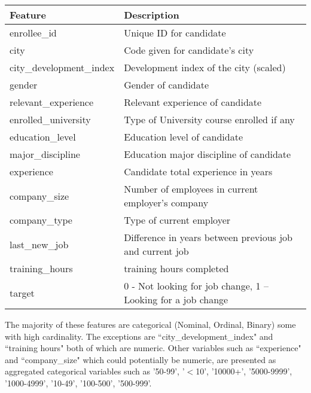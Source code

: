 \documentclass[11pt]{article}
\begin{document}
\begin{table}[h]
\centering
\begin{tabular}{ |p{4cm}||p{10cm}|  }
 
 \hline
 Feature 		& Description		\\
 \hline
enrollee\_id 	& Unique ID for candidate\\
city			& Code given for candidate's city \\
city\_development\_index & Development index of the city (scaled)\\
gender		& Gender of candidate\\
relevant\_experience & Relevant experience of candidate\\
enrolled\_university & Type of University course enrolled if any \\

education\_level & Education level of candidate\\

major\_discipline & Education major discipline of candidate \\

experience 	& Candidate total experience in years\\

company\_size 	& Number of employees in current employer's company \\

company\_type 	& Type of current employer\\

last\_new\_job 	& Difference in years between previous job and current job \\

training\_hours 	& training hours completed \\

target 		& 0 - Not looking for job change, 1 – Looking for a job change\\
 \hline
\end{tabular}
\end{table}



The majority of these features are categorical (Nominal, Ordinal, Binary) some with high cardinality. The exceptions are ``city\_development\_index" and ``training hours" both of which are numeric. Other variables such as ``experience" and ``company\_size" which could potentially be numeric, are presented as aggregated categorical variables such as '50-99', '$<$10', '10000+', '5000-9999', '1000-4999', '10-49', '100-500', '500-999'. 
\end{document}
